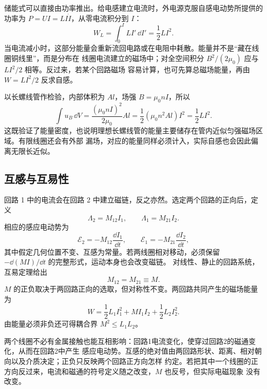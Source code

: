 储能式可以直接由功率推出。给电感建立电流时，外电源克服自感电动势所提供的功率为
$P=UI=LI\dot I$，从零电流积分到 $I$：
\begin{equation}
  W_L=\int_0^I LI'\,\dd I'=\frac12LI^2.
\end{equation}
当电流减小时，这部分能量会重新流回电路或在电阻中耗散。能量并不是“藏在线圈铜线里”，而是分布在
线圈电流建立的磁场中；对全空间积分 $B^2/(2\mu_0)$ 应与 $LI^2/2$ 相等。反过来，若某个回路磁场
容易计算，也可先算总磁场能量，再由 $W=LI^2/2$ 反求自感。

以长螺线管作检验，内部体积为 $Al$，场强 $B=\mu_0nI$，所以
\begin{equation}
  \int u_B\,\dd V
  =\frac{(\mu_0nI)^2}{2\mu_0}Al
  =\frac12(\mu_0n^2Al)I^2
  =\frac12LI^2.
\end{equation}
这既验证了能量密度，也说明理想长螺线管的能量主要储存在管内近似匀强磁场区域。有限线圈还会有外部
漏场，对应的能量同样必须计入，实际自感也会因此偏离无限长近似。

\selfInductanceDiagram

\subsection*{互感与互易性}

回路 1 中的电流会在回路 2 中建立磁链，反之亦然。选定两个回路的正向后，定义
\begin{equation}
  \Lambda_2=M_{12}I_1,
  \qquad
  \Lambda_1=M_{21}I_2.
\end{equation}
相应的感应电动势为
\begin{equation}
  \mathcal E_2=-M_{12}\frac{\dd I_1}{\dd t},
  \qquad
  \mathcal E_1=-M_{21}\frac{\dd I_2}{\dd t},
\end{equation}
其中假定几何位置不变、互感为常量。若两线圈相对移动，必须保留
$-\dd(MI)/\dd t$ 的完整形式，运动本身也会改变磁链。
对线性、静止的回路系统，互易定理给出
\begin{equation}
  \boxed{M_{12}=M_{21}\equiv M}.
\end{equation}
$M$ 的正负取决于两回路正向的选取，但对称性不变。两回路共同产生的磁场能量为
\begin{equation}
  \boxed{W=\frac12L_1I_1^2+MI_1I_2+\frac12L_2I_2^2}.
\end{equation}
由能量必须非负还可得耦合界 $M^2\le L_1L_2$。

两个线圈不必有金属接触也能互相影响：回路1电流变化，使穿过回路2的磁通变化，从而在回路2中产生
感应电动势。互感的绝对值由两回路形状、距离、相对朝向以及介质决定；正负只反映两个回路正方向怎样
约定。若把其中一个线圈的正方向反过来，电流和磁通的符号定义随之改变，$M$ 也反号，但实际电磁现象
没有改变。

